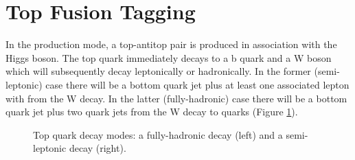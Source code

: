\section{Top Fusion Tagging}
In the \ttH production mode, a top-antitop pair is produced in association with the Higgs boson. The top quark immediately decays to a b quark and a W boson which will subsequently decay leptonically or hadronically. In the former (semi-leptonic) case there will be a bottom quark jet plus at least one associated lepton with \MET from the W decay. In the latter (fully-hadronic) case there will be a bottom quark jet plus two quark jets from the W decay to quarks (Figure \ref{fig:event_categorisaton:top_decays}). 
\begin{figure}[h!]
    \begin{center}
        \qquad
    \end{center}
    \caption{Top quark decay modes: a fully-hadronic decay (left) and a semi-leptonic decay (right).}
    \label{fig:event_categorisaton:top_decays}
\end{figure}

